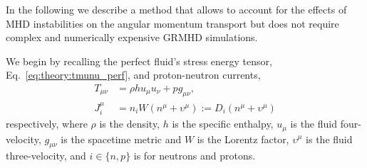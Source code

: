 In the following we describe a method that allows to account for the effects of \ac{MHD} 
instabilities on the angular momentum transport but does not require complex and numerically 
expensive \ac{GRMHD} simulations. 
%
%
%
%
%
%
%
%
%
%

We begin by recalling the perfect fluid's stress energy tensor,
Eq.~\eqref{eq:theory:tmunu_perf}, 
 and proton-neutron currents, 
%
\begin{subequations}
    \begin{align}
    T_{\mu\nu} &= \rho h u_{\mu} u_{\nu} + pg_{\mu\nu},  \\
    J^{\mu}_i &= n_i W(n^{\mu} + \upsilon^{\mu}) := D_i (n^{\mu} + \upsilon^{\mu})
    \end{align}
\end{subequations}
% 
respectively, where $\rho$ is the density, $h$ is the specific enthalpy, 
$u_{\mu}$ is the fluid four-velocity, $g_{\mu\nu}$ is the spacetime metric and 
$W$ is the Lorentz factor, $\upsilon^{\mu}$ is the fluid three-velocity,
and $i\in\{n,p\}$ is for neutrons and protons.

